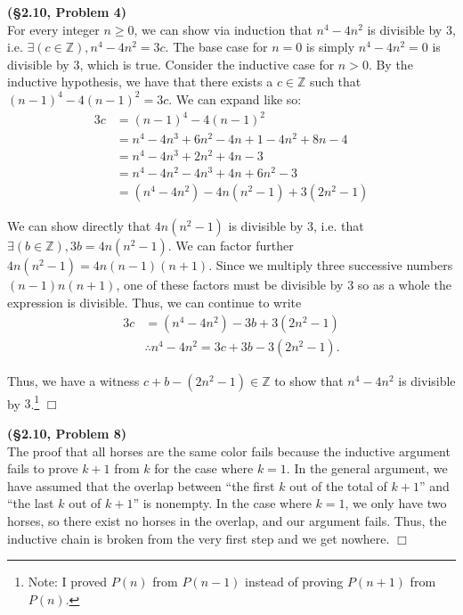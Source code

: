 \documentclass[12pt]{article}
\theoremstyle{definition}
\newenvironment{Solution}{\noindent {\sc Solution.}}{$\Box$ \vspace{2 ex}}
\begin{document}
\vspace{0.5cm}

\begin{Solution}
{\bf (\S2.10, Problem 4)}\\
For every integer $n \ge 0$, we can show via induction that $n^4 - 4n^2$ is divisible by $3$, i.e. $\exists (c\in \mathbb Z), n^4 -4n^2=3c$. The base case for $n=0$ is simply $n^4-4n^2=0$ is divisible by $3$, which is true. Consider the inductive case for $n > 0$. By the inductive hypothesis, we have that there exists a $c\in \mathbb Z$ such that $(n-1)^4-4(n-1)^2=3c$. We can expand like so:
\begin{align*}
    3c &= (n-1)^4-4(n-1)^2 \\ &=n^4 - 4n^3 + 6n^2 -4n +1-4n^2+8n-4 \\
    &= n^4 -4n^3 +2n^2 +4n-3 \\
    &= n^4 -4n^2-4n^3+4n+6n^2-3 \\
    &= \left(n^4 -4n^2\right)-4n(n^2-1)+3(2n^2-1)
\end{align*}

We can show directly that $4n(n^2-1)$ is divisible by $3$, i.e. that $\exists (b\in \mathbb Z), 3b=4n(n^2-1)$.
We can factor further $4n(n^2-1)=4n(n-1)(n+1)$. Since we multiply three successive numbers $(n-1)n(n+1)$, one of these factors must be divisible by $3$ so as a whole the expression is divisible. Thus, we can continue to write
\begin{align*}
    3c &= \left(n^4 -4n^2\right)-3b+3(2n^2-1) \\
    &\therefore n^4-4n^2 =3c+3b-3(2n^2-1).
\end{align*}

Thus, we have a witness $c+b-(2n^2-1)\in \mathbb Z$ to show that $n^4-4n^2$ is divisible by $3$.\footnote{Note: I proved $P(n)$ from $P(n-1)$ instead of proving $P(n+1)$ from $P(n)$.}
\end{Solution}

\vspace{0.5cm}

\begin{Solution}
{\bf (\S2.10, Problem 8)}\\
The proof that all horses are the same color fails because the inductive argument fails to prove $k+1$ from $k$ for the case where $k=1$. In the general argument, we have assumed that the overlap between ``the first $k$ out of the total of $k+1$'' and ``the last $k$ out of $k+1$'' is nonempty. In the case where $k=1$, we only have two horses, so there exist no horses in the overlap, and our argument fails. Thus, the inductive chain is broken from the very first step and we get nowhere.
\end{Solution}
\end{document}
